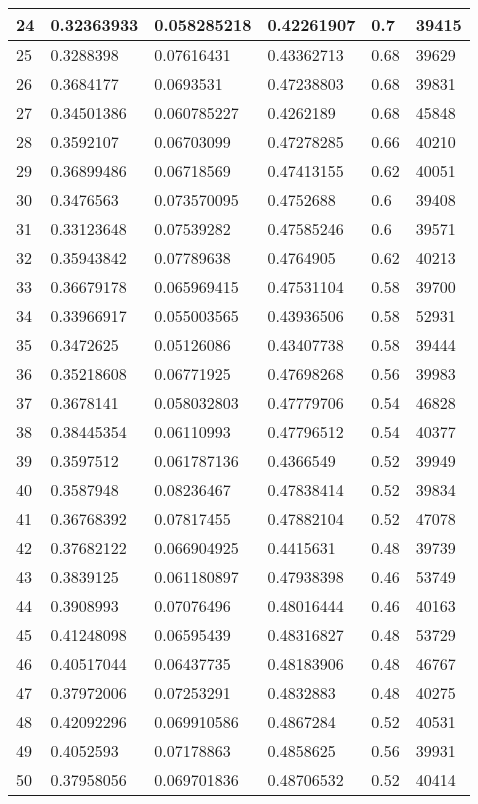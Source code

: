 \begin{longtable}{|l|l|l|l|l|l|}
24 & 0.32363933 & 0.058285218 & 0.42261907 & 0.7 & 39415 \\ \hline 
25 & 0.3288398 & 0.07616431 & 0.43362713 & 0.68 & 39629 \\ \hline 
26 & 0.3684177 & 0.0693531 & 0.47238803 & 0.68 & 39831 \\ \hline 
27 & 0.34501386 & 0.060785227 & 0.4262189 & 0.68 & 45848 \\ \hline 
28 & 0.3592107 & 0.06703099 & 0.47278285 & 0.66 & 40210 \\ \hline 
29 & 0.36899486 & 0.06718569 & 0.47413155 & 0.62 & 40051 \\ \hline 
30 & 0.3476563 & 0.073570095 & 0.4752688 & 0.6 & 39408 \\ \hline 
31 & 0.33123648 & 0.07539282 & 0.47585246 & 0.6 & 39571 \\ \hline 
32 & 0.35943842 & 0.07789638 & 0.4764905 & 0.62 & 40213 \\ \hline 
33 & 0.36679178 & 0.065969415 & 0.47531104 & 0.58 & 39700 \\ \hline 
34 & 0.33966917 & 0.055003565 & 0.43936506 & 0.58 & 52931 \\ \hline 
35 & 0.3472625 & 0.05126086 & 0.43407738 & 0.58 & 39444 \\ \hline 
36 & 0.35218608 & 0.06771925 & 0.47698268 & 0.56 & 39983 \\ \hline 
37 & 0.3678141 & 0.058032803 & 0.47779706 & 0.54 & 46828 \\ \hline 
38 & 0.38445354 & 0.06110993 & 0.47796512 & 0.54 & 40377 \\ \hline 
39 & 0.3597512 & 0.061787136 & 0.4366549 & 0.52 & 39949 \\ \hline 
40 & 0.3587948 & 0.08236467 & 0.47838414 & 0.52 & 39834 \\ \hline 
41 & 0.36768392 & 0.07817455 & 0.47882104 & 0.52 & 47078 \\ \hline 
42 & 0.37682122 & 0.066904925 & 0.4415631 & 0.48 & 39739 \\ \hline 
43 & 0.3839125 & 0.061180897 & 0.47938398 & 0.46 & 53749 \\ \hline 
44 & 0.3908993 & 0.07076496 & 0.48016444 & 0.46 & 40163 \\ \hline 
45 & 0.41248098 & 0.06595439 & 0.48316827 & 0.48 & 53729 \\ \hline 
46 & 0.40517044 & 0.06437735 & 0.48183906 & 0.48 & 46767 \\ \hline 
47 & 0.37972006 & 0.07253291 & 0.4832883 & 0.48 & 40275 \\ \hline 
48 & 0.42092296 & 0.069910586 & 0.4867284 & 0.52 & 40531 \\ \hline 
49 & 0.4052593 & 0.07178863 & 0.4858625 & 0.56 & 39931 \\ \hline 
50 & 0.37958056 & 0.069701836 & 0.48706532 & 0.52 & 40414 \\ \hline 
\end{longtable}